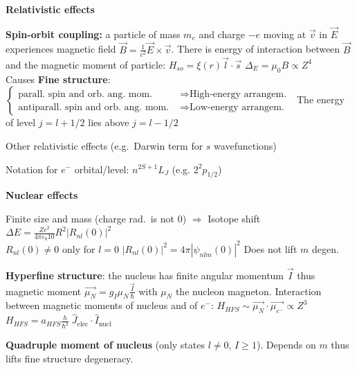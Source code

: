     \squishline

\textbf{Relativistic effects}
\begin{squishlist}
    \item \textbf{Spin-orbit coupling:} a particle of mass $m_e$ and charge $-e$ moving at $\vec{v}$ in $\vec{E}$ experiences magnetic field $\vec{B} = \frac{1}{c^2}\vec{E}\times \vec{v}$. There is energy of interaction between $\vec{B}$ and the magnetic moment of particle: $H_{so} = \xi(r) \vec{l}\cdot \vec{s}$ \qquad $\Delta_E = \mu_0 B \propto Z^4$\\
    Causes \textbf{Fine structure}: $\left\{\begin{aligned}
        \text{parall.\ spin and orb.\ ang.\ mom.\ } &\Rightarrow \text{High-energy arrangem.\ } \\
        \text{antiparall.\ spin and orb.\ ang.\ mom.\ } &\Rightarrow \text{Low-energy arrangem.\ }
    \end{aligned} \right.$
    The energy of level $j = l+1/2$ lies above $j = l-1/2$

    \item Other relativistic effects (e.g.\ Darwin term for $s$ wavefunctions)
    \item Notation for $e^-$ orbital/level: $n^{2S+1}L_J$ (e.g. $2^2 p_{1/2}$)
\end{squishlist}

\squishline

\textbf{Nuclear effects}
\begin{squishlist}
    \item Finite size and mass (charge rad.\ is not 0) $\Rightarrow$
    Isotope shift $\Delta E = \frac{Ze^2}{4 \pi \varepsilon_0 10}R^2 |R_{nl}(0)|^2$ \\ $R_{nl}(0) \neq 0$ only for $l=0$ \quad $|R_{nl}(0)|^2 = 4\pi |\psi_{nlm}(0)|^2$ \quad Does not lift $m$ degen.\
    \item \textbf{Hyperfine structure}: the nucleus has finite angular momentum $\vec{I}$ thus magnetic moment $\vec{\mu_N} = g_I \mu_N \frac{\vec{I}}{\hbar}$ with $\mu_N$ the nucleon magneton.
    Interaction between magnetic moments of nucleus and of $e^-$:
    $H_{HFS} \sim \vec{\mu_N}\cdot \vec{\mu_{e^-}} \propto Z^3$ \\
    $H_{HFS} = a_{HFS} \frac{h}{\hbar^2} \; \hat{J}_{\text{elec}}\cdot \hat{I}_{\text{nucl}}$
    \item \textbf{Quadruple moment of nucleus} (only states $l \neq 0$, $I \geq 1$). Depends on $m$ thus lifts fine structure degeneracy.
\end{squishlist}

